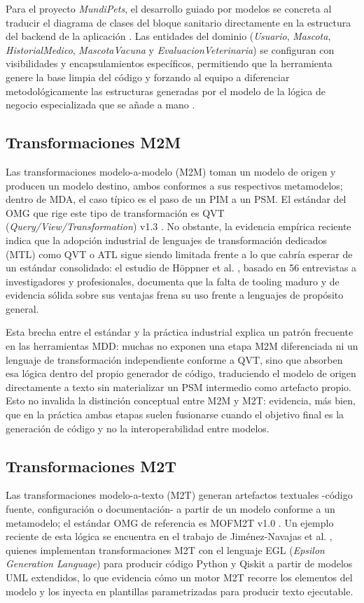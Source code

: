\documentclass[journal,onecolumn]{IEEEtran}
\begin{document}
	Para el proyecto \textit{MundiPets}, el desarrollo guiado por modelos se concreta al traducir el diagrama de clases del bloque sanitario directamente en la estructura del backend de la aplicación \cite{GuiaMDD2026}. Las entidades del dominio (\textit{Usuario}, \textit{Mascota}, \textit{HistorialMedico}, \textit{MascotaVacuna} y \textit{EvaluacionVeterinaria}) se configuran con visibilidades y encapsulamientos específicos, permitiendo que la herramienta genere la base limpia del código y forzando al equipo a diferenciar metodológicamente las estructuras generadas por el modelo de la lógica de negocio especializada que se añade a mano \cite{ERSMundiPets2026, GuiaMDD2026}.
	
	\subsection{Transformaciones M2M}
	Las transformaciones modelo-a-modelo (M2M) toman un modelo de origen y producen un modelo destino, ambos conformes a sus respectivos metamodelos; dentro de MDA, el caso típico es el paso de un PIM a un PSM. El estándar del OMG que rige este tipo de transformación es QVT (\textit{Query/View/Transformation}) v1.3 \cite{OMG2016QVT}. No obstante, la evidencia empírica reciente indica que la adopción industrial de lenguajes de transformación dedicados (MTL) como QVT o ATL sigue siendo limitada frente a lo que cabría esperar de un estándar consolidado: el estudio de Höppner et al. \cite{Hppner2022}, basado en 56 entrevistas a investigadores y profesionales, documenta que la falta de tooling maduro y de evidencia sólida sobre sus ventajas frena su uso frente a lenguajes de propósito general.
	
	Esta brecha entre el estándar y la práctica industrial explica un patrón frecuente en las herramientas MDD: muchas no exponen una etapa M2M diferenciada ni un lenguaje de transformación independiente conforme a QVT, sino que absorben esa lógica dentro del propio generador de código, traduciendo el modelo de origen directamente a texto sin materializar un PSM intermedio como artefacto propio. Esto no invalida la distinción conceptual entre M2M y M2T: evidencia, más bien, que en la práctica ambas etapas suelen fusionarse cuando el objetivo final es la generación de código y no la interoperabilidad entre modelos.
	
	\subsection{Transformaciones M2T}
	Las transformaciones modelo-a-texto (M2T) generan artefactos textuales -código fuente, configuración o documentación- a partir de un modelo conforme a un metamodelo; el estándar OMG de referencia es MOFM2T v1.0 \cite{OMG2008MOFM2T}. Un ejemplo reciente de esta lógica se encuentra en el trabajo de Jiménez-Navajas et al. \cite{JimenezNavajas2025QuantumUML}, quienes implementan transformaciones M2T con el lenguaje EGL (\textit{Epsilon Generation Language}) para producir código Python y Qiskit a partir de modelos UML extendidos, lo que evidencia cómo un motor M2T recorre los elementos del modelo y los inyecta en plantillas parametrizadas para producir texto ejecutable.
	
\end{document}
